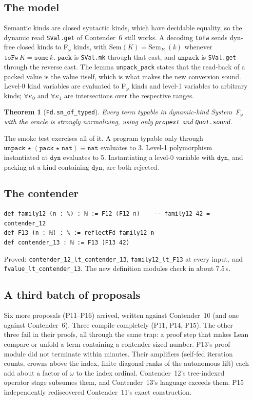 \documentclass[11pt]{article}
\newtheorem{theorem}{Theorem}
\theoremstyle{definition}
\theoremstyle{remark}
\newcommand{\lean}[1]{\texttt{#1}}
\begin{document}
\subsection{The model}
Semantic kinds are closed syntactic kinds, which have decidable equality, so
the dynamic read \lean{SVal.get} of Contender~6 still works. A decoding
\lean{toFw} sends dyn-free closed kinds to F$_\omega$ kinds, with
$\mathrm{Sem}(K)=\mathrm{Sem}_{F_\omega}(k)$ whenever
$\mathtt{toFw}\,K=\mathtt{some}\,k$. $\mathtt{pack}$ is \lean{SVal.mk} through
that cast, and $\mathtt{unpack}$ is \lean{SVal.get} through the reverse cast.
The lemma \lean{unpack\_pack} states that the read-back of a packed value is
the value itself, which is what makes the new conversion sound. Level-0 kind
variables are evaluated to F$_\omega$ kinds and level-1 variables to arbitrary
kinds; $\forall\kappa_0$ and $\forall\kappa_1$ are intersections over the
respective ranges.
\begin{theorem}[\lean{Fd.sn\_of\_typed}]
Every term typable in dynamic-kind System~F$_\omega$ with the oracle is
strongly normalizing, using only \lean{propext} and \lean{Quot.sound}.
\end{theorem}
The smoke test exercises all of it. A program typable only through
$\mathtt{unpack}\,\star\,(\mathtt{pack}\,\star\,\mathtt{nat})\equiv\mathtt{nat}$
evaluates to 3. Level-1 polymorphism instantiated at $\mathtt{dyn}$ evaluates
to 5. Instantiating a level-0 variable with $\mathtt{dyn}$, and packing at a
kind containing $\mathtt{dyn}$, are both rejected.

\subsection{The contender}
\begin{lstlisting}
def family12 (n : ℕ) : ℕ := F12 (F12 n)    -- family12 42 = contender_12
def F13 (n : ℕ) : ℕ := reflectFd family12 n
def contender_13 : ℕ := F13 (F13 42)
\end{lstlisting}
Proved: \lean{contender\_12\_lt\_\allowbreak contender\_13},
\lean{family12\_lt\_F13} at every input, and
\lean{fvalue\_lt\_\allowbreak contender\_13}. The new definition modules check
in about 7.5\,s.

\subsection{A third batch of proposals}
Six more proposals (P11--P16) arrived, written against Contender~10 (and one
against Contender~6). Three compile completely (P11, P14, P15). The other three
fail in their proofs, all through the same trap: a proof step that makes Lean
compare or unfold a term containing a contender-sized number. P13's proof module
did not terminate within minutes. Their amplifiers (self-fed iteration counts,
crowns above the index, finite diagonal ranks of the autonomous lift) each add
about a factor of $\omega$ to the index ordinal. Contender~12's tree-indexed
operator stage subsumes them, and Contender~13's language exceeds them. P15
independently rediscovered Contender~11's exact construction.
\end{document}
